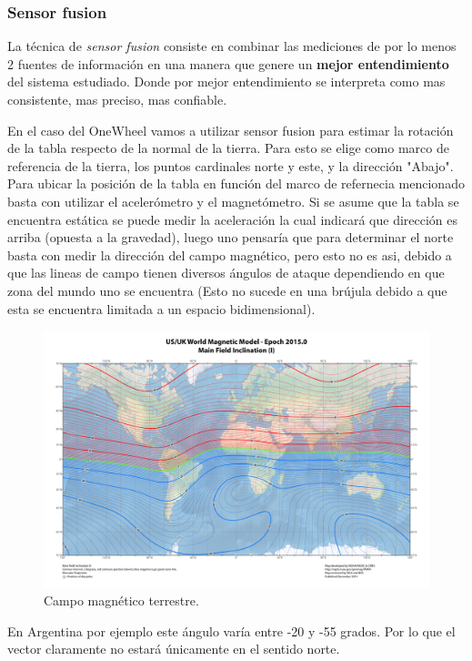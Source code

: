 \subsubsection{Sensor fusion}
La t\'ecnica de \textit{sensor fusion} consiste en combinar las mediciones de por lo menos 2 fuentes de informaci\'on en una manera que genere un \textbf{mejor entendimiento} del sistema estudiado. Donde por mejor entendimiento se interpreta como mas consistente, mas preciso, mas confiable.


En el caso del OneWheel vamos a utilizar sensor fusion para estimar la rotación de la tabla respecto de la normal de la tierra. Para esto se elige como marco de referencia de la tierra, los puntos cardinales norte y este, y la dirección "Abajo". Para ubicar la posición de la tabla en función del marco de refernecia mencionado basta con utilizar el acelerómetro y el magnetómetro. Si se asume que la tabla se encuentra estática se puede medir la aceleración la cual indicará que dirección es arriba (opuesta a la gravedad),  luego uno pensaría que para determinar el norte basta con medir la dirección del campo magnético, pero esto no es asi, debido a que las lineas de campo tienen diversos ángulos de ataque dependiendo en que zona del mundo uno se encuentra (Esto no sucede en una brújula debido a que esta se encuentra limitada a un espacio bidimensional).
 \begin{figure}[H]
	\center
	\includegraphics[width=1\linewidth, page=1,]{Imagenes/campo_terrestre}
	\caption{Campo magnético terrestre.}
	\label{fig:Esq_con:campo_terrestre}
\end{figure}
En Argentina por ejemplo este ángulo varía entre -20 y -55 grados. Por lo que el vector claramente no estará únicamente en el sentido norte.

